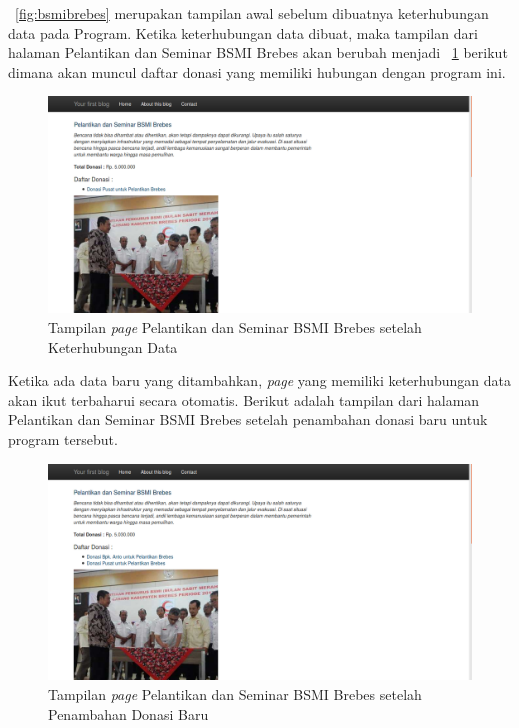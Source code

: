 \pic~\ref{fig:bsmibrebes} merupakan tampilan awal sebelum dibuatnya keterhubungan data pada Program. Ketika keterhubungan data dibuat, maka tampilan dari halaman Pelantikan dan Seminar BSMI Brebes akan berubah menjadi \pic~\ref{fig:bsmibrebes2} berikut dimana akan muncul daftar donasi yang memiliki hubungan dengan program ini.

\begin{figure}
	\centering
	\includegraphics[width=1\textwidth]
	{pics/50-bsmibrebes.png}
	\caption{Tampilan \textit{page} Pelantikan dan Seminar BSMI Brebes setelah Keterhubungan Data}
	\label{fig:bsmibrebes2}
\end{figure}
\vspace{-0.3cm}

Ketika ada data baru yang ditambahkan, \textit{page} yang memiliki keterhubungan data akan ikut terbaharui secara otomatis. Berikut adalah tampilan dari halaman Pelantikan dan Seminar BSMI Brebes setelah penambahan donasi baru untuk program tersebut.

\begin{figure}
	\centering
	\includegraphics[width=1\textwidth]
	{pics/50-bsmibrebes2.png}
	\caption{Tampilan \textit{page} Pelantikan dan Seminar BSMI Brebes setelah Penambahan Donasi Baru}
	\label{fig:bsmibrebes3}
\end{figure}
\vspace{-0.3cm}

